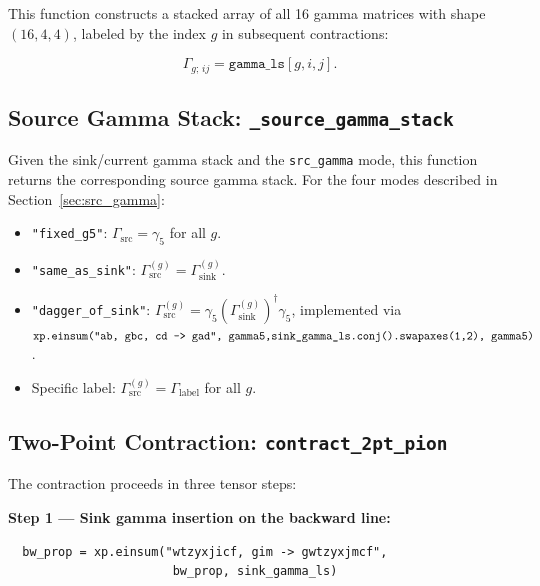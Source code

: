 \documentclass[11pt,a4paper]{article}
\newcommand{\gfive}{\gamma_5}
\newcommand{\gsrc}{\Gamma_{\text{src}}}
\newcommand{\gsink}{\Gamma_{\text{sink}}}
\begin{document}
This function constructs a stacked array of all 16 gamma matrices with shape
\((16, 4, 4)\), labeled by the index \(g\) in subsequent contractions:

\begin{equation}
\Gamma_{g;\,ij} = \texttt{gamma\_ls}[g, i, j] .
\label{eq:gamma_stack}
\end{equation}

\subsection{Source Gamma Stack: \texttt{\_source\_gamma\_stack}}

Given the sink/current gamma stack and the \texttt{src\_gamma} mode, this
function returns the corresponding source gamma stack.  For the four modes
described in Section~\ref{sec:src_gamma}:

\begin{itemize}[nosep]
  \item \texttt{"fixed\_g5"}: \(\gsrc = \gfive\) for all \(g\).
  \item \texttt{"same\_as\_sink"}: \(\gsrc^{(g)} = \gsink^{(g)}\).
  \item \texttt{"dagger\_of\_sink"}: \(\gsrc^{(g)} = \gfive
        (\gsink^{(g)})^\dagger \gfive\), implemented via\\
        \(\texttt{xp.einsum("ab, gbc, cd -> gad", gamma5,}\\
        \texttt{sink\_gamma\_ls.conj().swapaxes(1,2), gamma5)}\).
  \item Specific label: \(\gsrc^{(g)} = \Gamma_{\text{label}}\) for all \(g\).
\end{itemize}

\subsection{Two-Point Contraction: \texttt{contract\_2pt\_pion}}

The contraction proceeds in three tensor steps:

\textbf{Step 1 --- Sink gamma insertion on the backward line:}
\begin{verbatim}
  bw_prop = xp.einsum("wtzyxjicf, gim -> gwtzyxjmcf",
                       bw_prop, sink_gamma_ls)
\end{verbatim}
\end{document}
